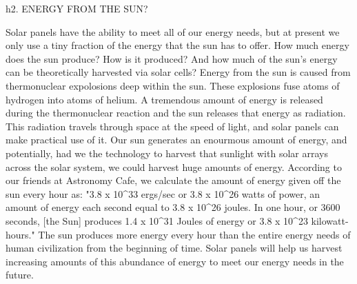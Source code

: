 h2. ENERGY FROM THE SUN?

Solar panels have the ability to meet all of our energy needs, but at present we only use a tiny fraction of the energy that the sun has to offer. How much energy does the sun produce? How is it produced? And how much of the sun's energy can be theoretically harvested via solar cells? 
Energy from the sun is caused from thermonuclear expolosions deep within the sun. These explosions fuse atoms of hydrogen into atoms of helium. A tremendous amount of energy is released during the thermonuclear reaction and the sun releases that energy as radiation. This radiation travels through space at the speed of light, and solar panels can make practical use of it. Our sun generates an enourmous amount of energy, and potentially, had we the technology to harvest that sunlight with solar arrays across the solar system, we could harvest huge amounts of energy. 
According to our friends at Astronomy Cafe, we calculate the amount of energy given off the sun every hour as: 
"3.8 x 10^33 ergs/sec or 3.8 x 10^26 watts of power, an amount of energy each second equal to 3.8 x 10^26 joules. In one hour, or 3600 seconds, [the Sun] produces 1.4 x 10^31 Joules of energy or 3.8 x 10^23 kilowatt-hours." 
The sun produces more energy every hour than the entire energy needs of human civilization from the beginning of time. Solar panels will help us harvest increasing amounts of this abundance of energy to meet our energy needs in the future. 